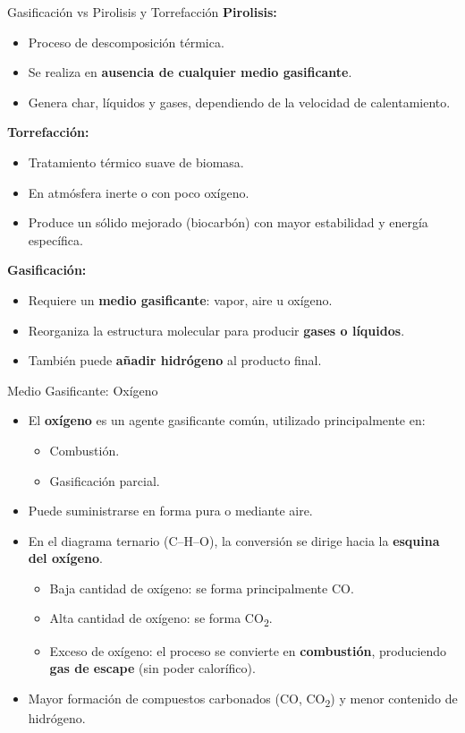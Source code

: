 \documentclass[../../main.tex]{subfiles}
\begin{document}
\begin{frame}{Gasificación vs Pirolisis y Torrefacción}
\footnotesize
\textbf{Pirolisis:}
\begin{itemize}
  \item Proceso de descomposición térmica.
  \item Se realiza en \textbf{ausencia de cualquier medio gasificante}.
  \item Genera char, líquidos y gases, dependiendo de la velocidad de calentamiento.
\end{itemize}
\textbf{Torrefacción:}
\begin{itemize}
  \item Tratamiento térmico suave de biomasa.
  \item En atmósfera inerte o con poco oxígeno.
  \item Produce un sólido mejorado (biocarbón) con mayor estabilidad y energía específica.
\end{itemize}
\textbf{Gasificación:}
\begin{itemize}
  \item Requiere un \textbf{medio gasificante}: vapor, aire u oxígeno.
  \item Reorganiza la estructura molecular para producir \textbf{gases o líquidos}.
  \item También puede \textbf{añadir hidrógeno} al producto final.
\end{itemize}
\end{frame}

\begin{frame}{Medio Gasificante: Oxígeno}
\small
\begin{itemize}
  \item El \textbf{oxígeno} es un agente gasificante común, utilizado principalmente en:
  \begin{itemize}
    \item Combustión.
    \item Gasificación parcial.
  \end{itemize}
  \item Puede suministrarse en forma pura o mediante aire.
  \item En el diagrama ternario (C–H–O), la conversión se dirige hacia la \textbf{esquina del oxígeno}.
  \begin{itemize}
    \item Baja cantidad de oxígeno: se forma principalmente CO.
    \item Alta cantidad de oxígeno: se forma CO\textsubscript{2}.
    \item Exceso de oxígeno: el proceso se convierte en \textbf{combustión}, produciendo \textbf{gas de escape} (sin poder calorífico).
  \end{itemize}
  \item Mayor formación de compuestos carbonados (CO, CO\textsubscript{2}) y menor contenido de hidrógeno.
\end{itemize}
\end{frame}
\end{document}
